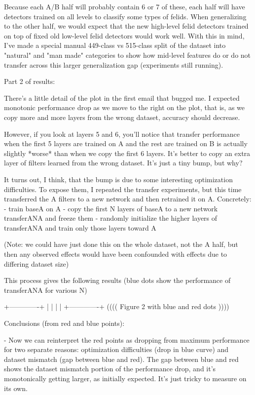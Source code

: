 Because each A/B half will probably contain 6 or 7 of these, each half will have detectors trained on all levels to classify some types of felids. When generalizing to the other half, we would expect that the new high-level felid detectors trained on top of fixed old low-level felid detectors would work well. With this in mind, I've made a special manual 449-class vs 515-class split of the dataset into "natural" and "man made" categories to show how mid-level features do or do not transfer across this larger generalization gap (experiments still running).






Part 2 of results:

There's a little detail of the plot in the first email that bugged me. I expected monotonic performance drop as we move to the right on the plot, that is, as we copy more and more layers from the wrong dataset, accuracy should decrease.

However, if you look at layers 5 and 6, you'll notice that transfer performance when the first 5 layers are trained on A and the rest are trained on B is actually slightly *worse* than when we copy the first 6 layers. It's better to copy an extra layer of filters learned from the wrong dataset. It's just a tiny bump, but why?

It turns out, I think, that the bump is due to some interesting optimization difficulties. To expose them, I repeated the transfer experiments, but this time transferred the A filters to a new network and then retrained it on A. Concretely:
 - train baseA on A
 - copy the first N layers of baseA to a new network transferANA and freeze them
 - randomly initialize the higher layers of transferANA and train only those layers toward A

(Note: we could have just done this on the whole dataset, not the A half, but then any observed effects would have been confounded with effects due to differing dataset size)

This process gives the following results (blue dots show the performance of transferANA for various N)

+-------------+
|                    |
|                    |
+-------------+
(((( Figure 2 with blue and red dots ))))

Conclusions (from red and blue points):

 - Now we can reinterpret the red points as dropping from maximum performance for two separate reasons: optimization difficulties (drop in blue curve) and dataset mismatch (gap between blue and red). The gap between blue and red shows the dataset mismatch portion of the performance drop, and it's monotonically getting larger, as initially expected. It's just tricky to measure on its own.


